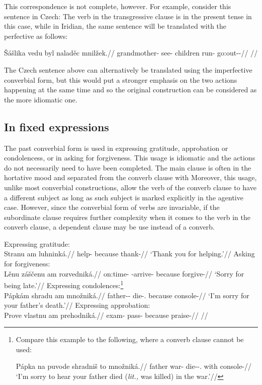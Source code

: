 This correspondence is not complete, however. For example, consider this
sentence in Czech:  The verb in the
transgressive clause is in the present tense in this case, while in Iridian, the
same sentence will be translated with the perfective as follows:

\pex
\begingl
\gla \v{S}ášlika vedu byl naladěc mnilžek.//
\glb grandmother- see- children run- go:out-\Av{}-\Pf{}//
\glft {}//
\endgl
\xe

The Czech sentence above can alternatively be translated using the
imperfective converbial form, but this would put a stronger emphasis on the two
actions happening at the same time and so the original construction can be
considered as the more idiomatic one.

\subsection{In fixed expressions}

The past converbial form is used in expressing gratitude, approbation or
condolencess, or in asking for forgiveness. This usage is idiomatic and the
actions do not necessarily need to have been completed. The main clause is often
in the hortative mood and separated from the converb
clause with  Moreover, this usage, unlike most converbial
constructions, allow the verb of the converb clause to have a different subject
as long as such subject is marked explicitly in the agentive case. However,
since the converbial form of verbs are invariable, if the subordinate clause
requires further complexity when it comes to the verb in the converb clause, a
dependent  clause may be use instead of a converb.

\pex
\a Expressing gratitude:\\
\begingl
\gla Stranu am luhninká.//
\glb help- because thank-//
\glft `Thank you for helping.'//
\endgl
\a Asking for forgiveness:\\
\begingl
\gla Lěnu záščenu am rozvedniká.//
\glb on:time-\Ins{} \Neg{}-arrive- because forgive-//
\glft `Sorry for being late.'//
\endgl
\a Expressing condolences:\footnote{Compare this example to the following, where
a converb clause cannot be used:

\ex[lingstyle=fnex,belowexskip=-1em]
\begingl
\gla Pápka na puvode shradniš to množniká.//
\glb father \Loc{} war-\Acc{} die-\Pv{}-\Subj.\Pf{} \Rz{} with console-//
\glft `I'm sorry to hear your father died (\emph{lit.,} was killed) in the war.'//
\endgl\xe}\\
\begingl
\gla Pápkám shradu am množniká.//
\glb father-\Dim{}-\Agt{} die-\Cv{}.\Pf{} because console-//
\glft `I'm sorry for your father's death.'//
\endgl
\a Expressing approbation:\\
\begingl
\gla Prove vlastnu am prehodniká.//
\glb exam-\Acc{} pass- because praise-//
\glft {}//
\endgl
\xe


